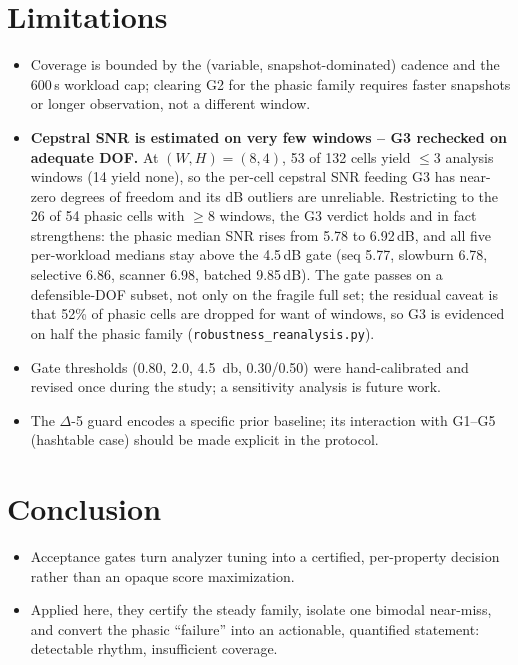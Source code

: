 \documentclass[conference]{IEEEtran}
\begin{document}
\section{Limitations}
\begin{itemize}
  \item Coverage is bounded by the (variable, snapshot-dominated) cadence and
        the 600\,s workload cap; clearing G2 for the phasic family requires
        faster snapshots or longer observation, not a different window.
  \item \textbf{Cepstral SNR is estimated on very few windows -- G3 rechecked on
        adequate DOF.} At $(W,H)=(8,4)$, 53 of 132 cells yield $\le 3$ analysis
        windows (14 yield none), so the per-cell cepstral SNR feeding G3 has
        near-zero degrees of freedom and its dB outliers are unreliable.
        Restricting to the 26 of 54 phasic cells with $\ge 8$ windows, the G3
        verdict holds and in fact strengthens: the phasic median SNR rises from
        5.78 to 6.92\,dB, and all five per-workload medians stay above the
        4.5\,dB gate (seq 5.77, slowburn 6.78, selective 6.86, scanner 6.98,
        batched 9.85\,dB). The gate passes on a defensible-DOF subset, not only
        on the fragile full set; the residual caveat is that 52\% of phasic cells
        are dropped for want of windows, so G3 is evidenced on half the phasic
        family (\texttt{robustness\_reanalysis.py}).
  \item Gate thresholds (0.80, 2.0, \SI{4.5}{\decibel}, 0.30/0.50) were
        hand-calibrated and revised once during the study; a sensitivity
        analysis is future work.
  \item The $\Delta$-5 guard encodes a specific prior baseline; its interaction
        with G1--G5 (hashtable case) should be made explicit in the protocol.
\end{itemize}

\section{Conclusion}
\begin{itemize}
  \item Acceptance gates turn analyzer tuning into a certified, per-property
        decision rather than an opaque score maximization.
  \item Applied here, they certify the steady family, isolate one bimodal
        near-miss, and convert the phasic ``failure'' into an actionable,
        quantified statement: detectable rhythm, insufficient coverage.
\end{itemize}



\end{document}
